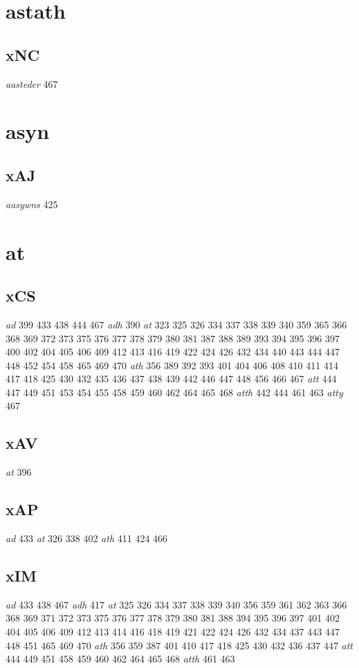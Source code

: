 \documentclass[a4paper,twocolumn]{article}
\begin{document}
\section{astath}
\label{sec:org22e452e}
\subsection{xNC}
\label{sec:orgae5bd6b}
\emph{aasteder} 467 
\section{asyn}
\label{sec:org21ef0f7}
\subsection{xAJ}
\label{sec:org7d7d749}
\emph{aasywns} 425 
\section{at}
\label{sec:orgcfe80a8}
\subsection{xCS}
\label{sec:orgacc494a}
\emph{ad} 399 433 438 444 467 \emph{adh} 390 \emph{at} 323 325 326 334 337 338 339 340 359 365 366 368 369 372 373 375 376 377 378 379 380 381 387 388 389 393 394 395 396 397 400 402 404 405 406 409 412 413 416 419 422 424 426 432 434 440 443 444 447 448 452 454 458 465 469 470 \emph{ath} 356 389 392 393 401 404 406 408 410 411 414 417 418 425 430 432 435 436 437 438 439 442 446 447 448 456 466 467 \emph{att} 444 447 449 451 453 454 455 458 459 460 462 464 465 468 \emph{atth} 442 444 461 463 \emph{atty} 467 
\subsection{xAV}
\label{sec:org92bbf73}
\emph{at} 396 
\subsection{xAP}
\label{sec:orgdf62804}
\emph{ad} 433 \emph{at} 326 338 402 \emph{ath} 411 424 466 
\subsection{xIM}
\label{sec:orgb26d074}
\emph{ad} 433 438 467 \emph{adh} 417 \emph{at} 325 326 334 337 338 339 340 356 359 361 362 363 366 368 369 371 372 373 375 376 377 378 379 380 381 388 394 395 396 397 401 402 404 405 406 409 412 413 414 416 418 419 421 422 424 426 432 434 437 443 447 448 451 465 469 470 \emph{ath} 356 359 387 401 410 417 418 425 430 432 436 437 447 \emph{att} 444 449 451 458 459 460 462 464 465 468 \emph{atth} 461 463 
\end{document}
